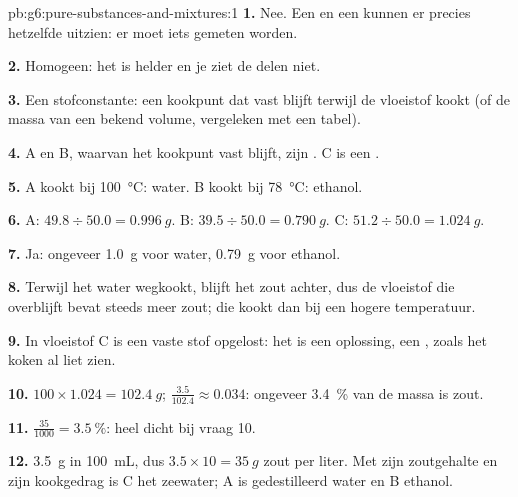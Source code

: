 \begin{solution}{pb:g6:pure-substances-and-mixtures:1}
\textbf{1.} Nee. Een  en een  kunnen er
precies hetzelfde uitzien: er moet iets gemeten worden.

\textbf{2.} Homogeen: het is helder en je ziet de delen niet.

\textbf{3.} Een stofconstante: een kookpunt dat vast blijft terwijl de
vloeistof kookt (of de massa van een bekend volume, vergeleken met een
tabel).

\textbf{4.} A en B, waarvan het kookpunt vast blijft, zijn . C is een .

\textbf{5.} A kookt bij \qty{100}{\celsius}: water. B kookt bij
\qty{78}{\celsius}: ethanol.

\textbf{6.} A: $49.8 \div 50.0 = \qty{0.996}{g}$. B: $39.5 \div 50.0 =
\qty{0.790}{g}$. C: $51.2 \div 50.0 = \qty{1.024}{g}$.

\textbf{7.} Ja: ongeveer \qty{1.0}{g} voor water, \qty{0.79}{g} voor
ethanol.

\textbf{8.} Terwijl het water wegkookt, blijft het zout achter, dus de
vloeistof die overblijft bevat steeds meer zout; die kookt dan bij een
hogere temperatuur.

\textbf{9.} In vloeistof C is een vaste stof opgelost: het is een
oplossing, een , zoals het koken al liet zien.

\textbf{10.} $100 \times 1.024 = \qty{102.4}{g}$; $\frac{3.5}{102.4}
\approx 0.034$: ongeveer \qty{3.4}{\percent} van de massa is zout.

\textbf{11.} $\frac{35}{1000} = \qty{3.5}{\percent}$: heel dicht bij
vraag 10.

\textbf{12.} \qty{3.5}{g} in \qty{100}{mL}, dus $3.5 \times 10 =
\qty{35}{g}$ zout per liter. Met zijn zoutgehalte en zijn kookgedrag is C
het zeewater; A is gedestilleerd water en B ethanol.
\end{solution}
